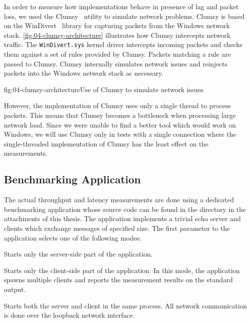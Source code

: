 In order to measure how implementations behave in presence of lag and packet loss, we used the
Clumsy~\cite{clumsy} utility to simulate network problems. Clumsy is based on the
WinDivert~\cite{WinDivert} library for capturing packets from the Windows network stack.
\autoref{fig:04-clumsy-architecture} illustrates how Clumsy intercepts network traffic. The
\texttt{WinDivert.sys} kernel driver intercepts incoming packets and checks them against a set of
rules provided by Clumsy. Packets matching a rule are passed to Clumsy. Clumsy internally simulates
network issues and reinjects packets into the Windows network stack as necessary.

\begin{myFigure}{fig:04-clumsy-architecture}{Use of Clumsy to simulate network issues}

  \resizebox{0.8\linewidth}{!}{}

\end{myFigure}

However, the implementation of Clumsy uses only a single thread to process packets. This means that
Clumsy becomes a bottleneck when processing large network load.  Since we were unable to find a
better tool which would work on Windows, we will use Clumsy only in tests with a single connection
where the single-threaded implementation of Clumsy has the least effect on the measurements.

\subsection{Benchmarking Application}\label{sec:04-benchmark-app}

The actual throughput and latency measurements are done using a dedicated benchmarking \dotnet{}
application whose source code can be found in the
 directory in the attachments of this thesis.
The application implements a trivial echo server and clients which exchange messages of specified
size. The first parameter to the application selects one of the following modes:

\begin{description}

   Starts only the server-side part of the application.

   Starts only the client-side part of the application. In this mode, the
application spawns multiple clients and reports the measurement results on the standard output.

   Starts both the server and client in the same process. All network
communication is done over the loopback network interface.

\end{description}

